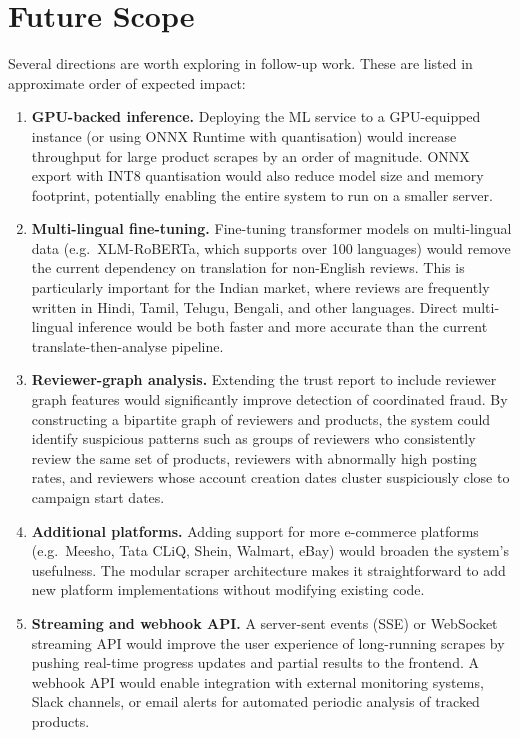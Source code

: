 \documentclass[12pt,a4paper,oneside]{report}
\begin{document}
\section{Future Scope}
Several directions are worth exploring in follow-up work. These are
listed in approximate order of expected impact:

\begin{enumerate}[leftmargin=*]
  \item \textbf{GPU-backed inference.} Deploying the ML service to a
        GPU-equipped instance (or using ONNX Runtime with quantisation)
        would increase throughput for large product scrapes by an order of
        magnitude. ONNX export with INT8 quantisation would also reduce
        model size and memory footprint, potentially enabling the entire
        system to run on a smaller server.

  \item \textbf{Multi-lingual fine-tuning.} Fine-tuning transformer
        models on multi-lingual data (e.g.\ XLM-RoBERTa, which supports
        over 100 languages) would remove the current dependency on
        translation for non-English reviews. This is particularly
        important for the Indian market, where reviews are frequently
        written in Hindi, Tamil, Telugu, Bengali, and other languages.
        Direct multi-lingual inference would be both faster and more
        accurate than the current translate-then-analyse pipeline.

  \item \textbf{Reviewer-graph analysis.} Extending the trust report to
        include reviewer graph features would significantly improve
        detection of coordinated fraud. By constructing a bipartite graph
        of reviewers and products, the system could identify suspicious
        patterns such as groups of reviewers who consistently review the
        same set of products, reviewers with abnormally high posting
        rates, and reviewers whose account creation dates cluster
        suspiciously close to campaign start dates.

  \item \textbf{Additional platforms.} Adding support for more
        e-commerce platforms (e.g.\ Meesho, Tata CLiQ, Shein, Walmart,
        eBay) would broaden the system's usefulness. The modular scraper
        architecture makes it straightforward to add new platform
        implementations without modifying existing code.

  \item \textbf{Streaming and webhook API.} A server-sent events (SSE)
        or WebSocket streaming API would improve the user experience of
        long-running scrapes by pushing real-time progress updates and
        partial results to the frontend. A webhook API would enable
        integration with external monitoring systems, Slack channels, or
        email alerts for automated periodic analysis of tracked products.


\end{enumerate}
\end{document}
